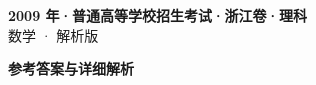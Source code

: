 \documentclass[zihao=-4, a4paper]{ctexart}
\begin{document}
\begin{center}
  {\Large\bfseries 2009 年·普通高等学校招生考试·浙江卷·理科}\\[4pt]
  {\large 数学 · 解析版}
\end{center}
\medskip
{}

\clearpage
{}
\begin{center}{\Large\bfseries 参考答案与详细解析}\end{center}
\medskip

\end{document}
